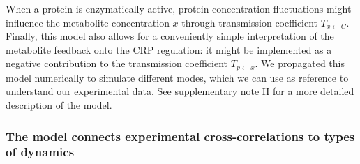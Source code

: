 When a protein is enzymatically active, protein concentration fluctuations might influence the metabolite concentration $x$ through transmission coefficient $T_{{x}\leftarrow{C}}$.
%
Finally, this model also allows for a conveniently simple interpretation of the metabolite feedback onto the CRP regulation:
it might be implemented as a negative contribution to the transmission coefficient $T_{{p}\leftarrow{x}}$.
%
We propagated this model numerically to simulate different modes, which we can use as reference to understand our experimental data.
%
See supplementary note II for a more detailed description of the model.

\subsubsection{The model connects experimental cross-correlations to types of dynamics}

